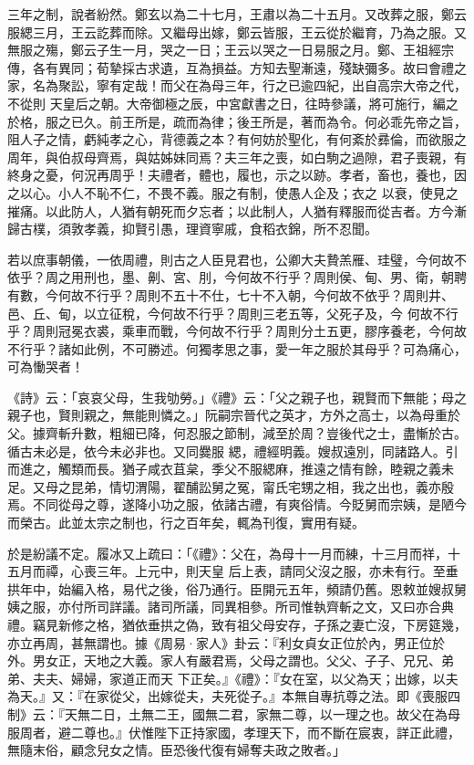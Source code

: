 \begin{pinyinscope}
 三年之制，說者紛然。鄭玄以為二十七月，王肅以為二十五月。又改葬之服，鄭云服緦三月，王云訖葬而除。又繼母出嫁，鄭云皆服，王云從於繼育，乃為之服。又無服之殤，鄭云子生一月，哭之一日；王云以哭之一日易服之月。鄭、王祖經宗傳，各有異同；荀摯採古求遺，互為損益。方知去聖漸遠，殘缺彌多。故曰會禮之家，名為聚訟，寧有定哉！而父在為母三年，行之已逾四紀，出自高宗大帝之代，不從則
 天皇后之朝。大帝御極之辰，中宮獻書之日，往時參議，將可施行，編之於格，服之已久。前王所是，疏而為律；後王所是，著而為令。何必乖先帝之旨，阻人子之情，虧純孝之心，背德義之本？有何妨於聖化，有何紊於彞倫，而欲服之周年，與伯叔母齊焉，與姑姊妹同焉？夫三年之喪，如白駒之過隙，君子喪親，有終身之憂，何況再周乎！夫禮者，體也，履也，示之以跡。孝者，畜也，養也，因之以心。小人不恥不仁，不畏不義。服之有制，使愚人企及；衣之
 以衰，使見之摧痛。以此防人，人猶有朝死而夕忘者；以此制人，人猶有釋服而從吉者。方今漸歸古樸，須敦孝義，抑賢引愚，理資寧戚，食稻衣錦，所不忍聞。



 若以庶事朝儀，一依周禮，則古之人臣見君也，公卿大夫贄羔雁、珪璧，今何故不依乎？周之用刑也，墨、劓、宮、刖，今何故不行乎？周則侯、甸、男、衛，朝聘有數，今何故不行乎？周則不五十不仕，七十不入朝，今何故不依乎？周則井、邑、丘、甸，以立征稅，今何故不行乎？周則三老五等，父死子及，今
 何故不行乎？周則冠冕衣裘，乘車而戰，今何故不行乎？周則分土五更，膠序養老，今何故不行乎？諸如此例，不可勝述。何獨孝思之事，愛一年之服於其母乎？可為痛心，可為慟哭者！



 《詩》云：「哀哀父母，生我劬勞。」《禮》云：「父之親子也，親賢而下無能；母之親子也，賢則親之，無能則憐之。」阮嗣宗晉代之英才，方外之高士，以為母重於父。據齊斬升數，粗細已降，何忍服之節制，減至於周？豈後代之士，盡慚於古。循古未必是，依今未必非也。又同爨服
 緦，禮經明義。嫂叔遠別，同諸路人。引而進之，觸類而長。猶子咸衣苴枲，季父不服緦麻，推遠之情有餘，睦親之義未足。又母之昆弟，情切渭陽，翟酺訟舅之冤，甯氏宅甥之相，我之出也，義亦殷焉。不同從母之尊，遂降小功之服，依諸古禮，有爽俗情。今貶舅而宗姨，是陋今而榮古。此並太宗之制也，行之百年矣，輒為刊復，實用有疑。



 於是紛議不定。履冰又上疏曰：「《禮》：父在，為母十一月而練，十三月而祥，十五月而禫，心喪三年。上元中，則天皇
 后上表，請同父沒之服，亦未有行。至垂拱年中，始編入格，易代之後，俗乃通行。臣開元五年，頻請仍舊。恩敕並嫂叔舅姨之服，亦付所司詳議。諸司所議，同異相參。所司惟執齊斬之文，又曰亦合典禮。竊見新修之格，猶依垂拱之偽，致有祖父母安存，子孫之妻亡沒，下房筵幾，亦立再周，甚無謂也。據《周易·家人》卦云：『利女貞女正位於內，男正位於外。男女正，天地之大義。家人有嚴君焉，父母之謂也。父父、子子、兄兄、弟弟、夫夫、婦婦，家道正而天
 下正矣。』《禮》：『女在室，以父為天；出嫁，以夫為天。』又：『在家從父，出嫁從夫，夫死從子。』本無自專抗尊之法。即《喪服四制》云：『天無二日，土無二王，國無二君，家無二尊，以一理之也。故父在為母服周者，避二尊也。』伏惟陛下正持家國，孝理天下，而不斷在宸衷，詳正此禮，無隨末俗，顧念兒女之情。臣恐後代復有婦奪夫政之敗者。」




\end{pinyinscope}
